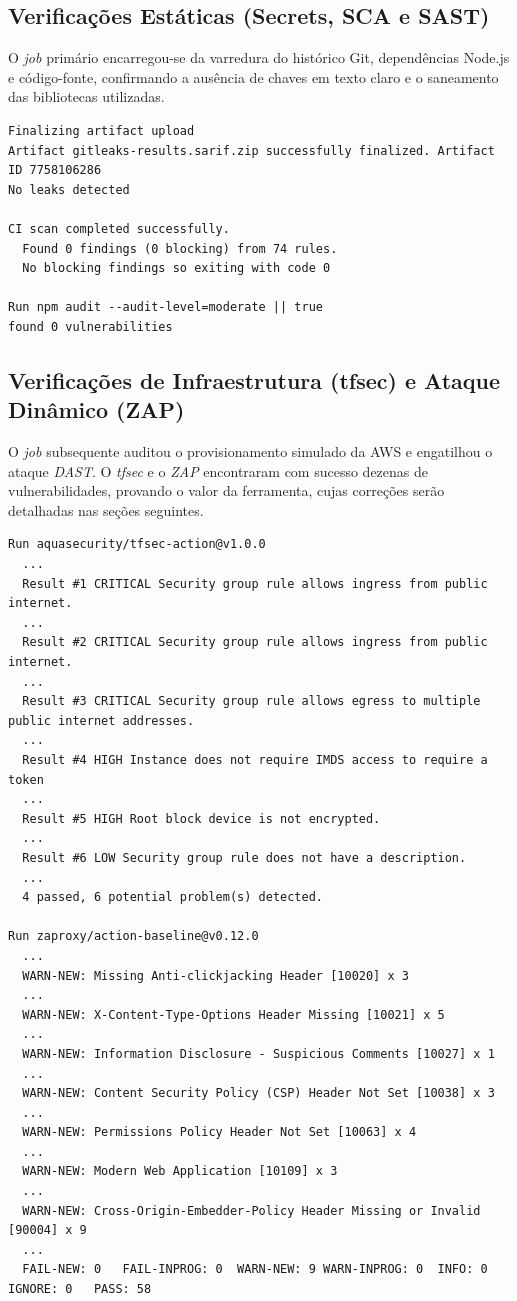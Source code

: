 \documentclass[12pt, a4paper]{article}
\begin{document}
\subsection{Verificações Estáticas (Secrets, SCA e SAST)}
O \textit{job} primário encarregou-se da varredura do histórico Git, dependências Node.js e código-fonte, confirmando a ausência de chaves em texto claro e o saneamento das bibliotecas utilizadas.

\begin{lstlisting}[caption=Logs de aprovação das camadas de Código e Dependências]
Finalizing artifact upload
Artifact gitleaks-results.sarif.zip successfully finalized. Artifact ID 7758106286
No leaks detected

CI scan completed successfully.
  Found 0 findings (0 blocking) from 74 rules.
  No blocking findings so exiting with code 0

Run npm audit --audit-level=moderate || true
found 0 vulnerabilities
\end{lstlisting}

\subsection{Verificações de Infraestrutura (tfsec) e Ataque Dinâmico (ZAP)}
O \textit{job} subsequente auditou o provisionamento simulado da AWS e engatilhou o ataque \textit{DAST}. O \textit{tfsec} e o \textit{ZAP} encontraram com sucesso dezenas de vulnerabilidades, provando o valor da ferramenta, cujas correções serão detalhadas nas seções seguintes.

\begin{lstlisting}[caption=Captura da execução do IaC Scan e DAST]
Run aquasecurity/tfsec-action@v1.0.0
  ...
  Result #1 CRITICAL Security group rule allows ingress from public internet.
  ...
  Result #2 CRITICAL Security group rule allows ingress from public internet. 
  ...
  Result #3 CRITICAL Security group rule allows egress to multiple public internet addresses.
  ...
  Result #4 HIGH Instance does not require IMDS access to require a token
  ...
  Result #5 HIGH Root block device is not encrypted.
  ...
  Result #6 LOW Security group rule does not have a description.
  ...
  4 passed, 6 potential problem(s) detected.

Run zaproxy/action-baseline@v0.12.0
  ...
  WARN-NEW: Missing Anti-clickjacking Header [10020] x 3 
  ...
  WARN-NEW: X-Content-Type-Options Header Missing [10021] x 5
  ...
  WARN-NEW: Information Disclosure - Suspicious Comments [10027] x 1
  ...
  WARN-NEW: Content Security Policy (CSP) Header Not Set [10038] x 3 
  ...
  WARN-NEW: Permissions Policy Header Not Set [10063] x 4 
  ...
  WARN-NEW: Modern Web Application [10109] x 3 
  ...
  WARN-NEW: Cross-Origin-Embedder-Policy Header Missing or Invalid [90004] x 9 
  ...
  FAIL-NEW: 0	FAIL-INPROG: 0	WARN-NEW: 9	WARN-INPROG: 0	INFO: 0	IGNORE: 0	PASS: 58
\end{lstlisting}
\end{document}
